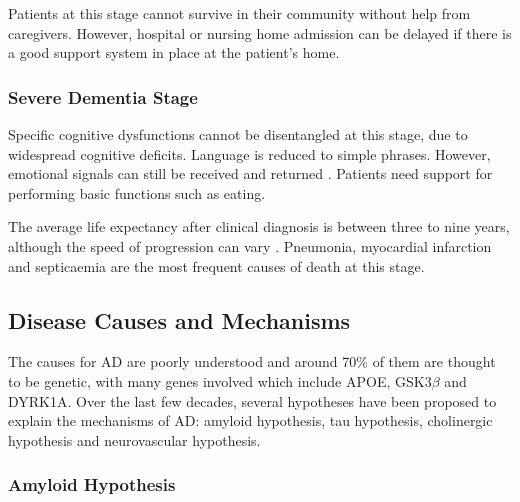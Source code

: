Patients at this stage cannot survive in their community without help from caregivers. However, hospital or nursing home admission can be delayed if there is a good support system in place at the patient's home. 

\subsubsection{Severe Dementia Stage}

Specific cognitive dysfunctions cannot be disentangled at this stage, due to widespread cognitive deficits. Language is reduced to simple phrases. However, emotional signals can still be received and returned \cite{forstl1999clinical}. Patients need support for performing basic functions such as eating. 

The average life expectancy after clinical diagnosis is between three to nine years, although the speed of progression can vary \cite{querfurth2010mechanisms}. Pneumonia, myocardial infarction and septicaemia are the most frequent causes of death at this stage.

\subsection{Disease Causes and Mechanisms}
\label{sec:bckCau}

The causes for AD are poorly understood and around 70\% of them are thought to be genetic, with many genes involved which include APOE, GSK3$\beta$ and DYRK1A\cite{Ballard2011alzheimers}. Over the last few decades, several hypotheses have been proposed to explain the mechanisms of AD: amyloid hypothesis, tau hypothesis, cholinergic hypothesis and neurovascular hypothesis.


\subsubsection{Amyloid Hypothesis}
\label{sec:bckAmyHyp}

